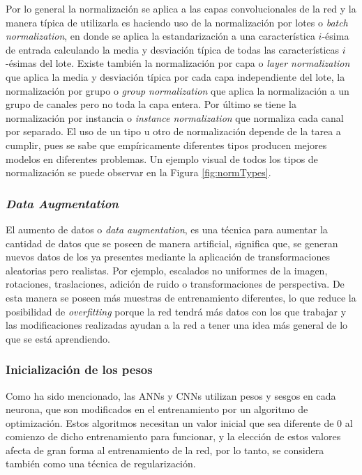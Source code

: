 Por lo general la normalización se aplica a las capas convolucionales de la red y la manera típica de utilizarla es haciendo uso de la normalización por lotes o \textit{batch normalization}, en donde se aplica la estandarización a una característica $i$-ésima de entrada calculando la media y desviación típica de todas las características $i$-ésimas del lote. Existe también la normalización por capa o \textit{layer normalization} que aplica la media y desviación típica por cada capa independiente del lote, la normalización por grupo o \textit{group normalization} que aplica la normalización a un grupo de canales pero no toda la capa entera. Por último se tiene la normalización por instancia o \textit{instance normalization} que normaliza cada canal por separado. El uso de un tipo u otro de normalización depende de la tarea a cumplir, pues se sabe que empíricamente diferentes tipos producen mejores modelos en diferentes problemas. Un ejemplo visual de todos los tipos de normalización se puede observar en la Figura \ref{fig:normTypes}. 

\subsubsection{\textit{Data Augmentation}}
El aumento de datos o \textit{data augmentation}, es una técnica para aumentar la cantidad de datos que se poseen de manera artificial, significa que, se generan nuevos datos de los ya presentes mediante la aplicación de transformaciones aleatorias pero realistas. Por ejemplo, escalados no uniformes de la imagen, rotaciones, traslaciones, adición de ruido o transformaciones de perspectiva. De esta manera se poseen más muestras de entrenamiento diferentes, lo que reduce la posibilidad de \textit{overfitting} porque la red tendrá más datos con los que trabajar y las modificaciones realizadas ayudan a la red a tener una idea más general de lo que se está aprendiendo.

\subsubsection{Inicialización de los pesos}
Como ha sido mencionado, las ANNs y CNNs utilizan pesos y sesgos en cada neurona, que son modificados en el entrenamiento por un algoritmo de optimización. Estos algoritmos necesitan un valor inicial que sea diferente de 0 al comienzo de dicho entrenamiento para funcionar, y la elección de estos valores afecta de gran forma al entrenamiento de la red, por lo tanto, se considera también como una técnica de regularización.

